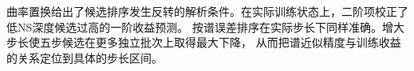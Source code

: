 曲率置换给出了候选排序发生反转的解析条件。在实际训练状态上，二阶项校正了低NS深度候选过高的一阶收益预测。
按谱误差排序在实际步长下同样准确。增大步长使五步候选在更多独立批次上取得最大下降，
从而把谱近似精度与训练收益的关系定位到具体的步长区间。
